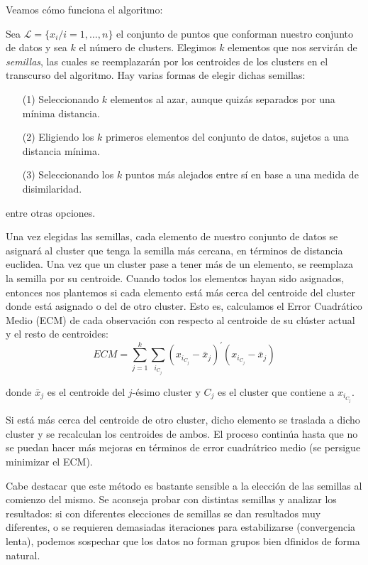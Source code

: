 Veamos cómo funciona el algoritmo: \newline

Sea $\mathcal{L} = \{x_{i} / i = 1,\dots,n\}$ el conjunto de puntos que conforman nuestro conjunto de datos y sea $k$ el número de clusters. Elegimos $k$ elementos que nos servirán de 
\textit{semillas}, las cuales se reemplazarán por los centroides de los clusters en el transcurso del algoritmo. Hay varias formas de elegir dichas semillas:
\begin{itemize}
    \item[(1)] Seleccionando $k$ elementos al azar, aunque quizás separados por una mínima distancia.
    \item[(2)] Eligiendo los $k$ primeros elementos del conjunto de datos, sujetos a una distancia mínima. 
    \item[(3)] Seleccionando los $k$ puntos más alejados entre sí en base a una medida de disimilaridad.   
\end{itemize}

entre otras opciones. \newline

Una vez elegidas las semillas, cada elemento de nuestro conjunto de datos se asignará al cluster que tenga la semilla más cercana, en términos de distancia euclidea. Una vez que 
un cluster pase a tener más de un elemento, se reemplaza la semilla por su centroide. Cuando todos los elementos hayan sido asignados, entonces nos plantemos si cada elemento está
más cerca del centroide del cluster donde está asignado o del de otro cluster. Esto es, calculamos el Error Cuadrático Medio (ECM) de cada observación con respecto al
centroide de su clúster actual y el resto de centroides:
\[
ECM = \sum_{j=1}^{k}\sum_{i_{C_{j}}}(x_{i_{C_{j}}}-\bar{x}_{j})^{'}(x_{i_{C_{j}}}-\bar{x}_{j})
\]

donde $\bar{x}_{j}$ es el centroide del $j$-ésimo cluster y $C_{j}$ es el cluster que contiene a $x_{i_{C_{j}}}$. \newline

Si está más cerca del centroide de otro cluster, dicho elemento se traslada a dicho cluster y se recalculan los centroides de ambos. El proceso continúa hasta 
que no se puedan hacer más mejoras en términos de error cuadrátrico medio (se persigue minimizar el ECM). \newline

Cabe destacar que este método es bastante sensible a la elección de las semillas al comienzo del mismo. Se aconseja probar con distintas semillas y analizar los resultados: si 
con diferentes elecciones de semillas se dan resultados muy diferentes, o se requieren demasiadas iteraciones para estabilizarse (convergencia lenta), podemos sospechar que los datos no 
forman grupos bien dfinidos de forma natural. \newline

